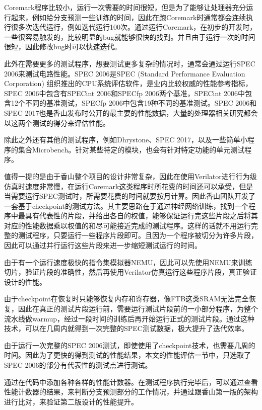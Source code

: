 Coremark程序比较小，运行一次需要的时间很短，但是为了能够让处理器充分运行起来，例如给分支预测一些训练的时间，因此在跑Coremark时通常都会连续执行很多次迭代运行，例如迭代运行100次。通过运行Coremark，在初步的开发时，一些很容易触发的，比较明显的bug就能够很快的找到。并且由于运行一次的时间很短，因此修改bug时可以快速迭代。

此外在需要更多的测试程序，想要测试更多复杂的情况时，通常会通过运行SPEC 2006\cite{spec-2006}来测试电路性能。SPEC 2006是SPEC (Standard Performance Evaluation Corporation) 组织推出的CPU系统评估软件，是业内比较权威的性能参考指标，SPEC 2006中包含有SPECint 2006和SPECfp 2006两个基准，SPECint 2006中包含12个不同的基准测试，SPECfp 2006中包含19种不同的基准测试。SPEC 2006和SPEC 2017也是香山发布时公开的最主要的性能数据，大量的处理器相关研究都会以这两个测试的得分来评估性能。

除此之外还有其他的测试程序，例如Dhrystone\cite{dhrystone}、SPEC 2017，以及一些简单小程序的集合Microbench。针对某些特定的模块，也会有针对特定功能的单元测试程序。


值得一提的是由于香山整个项目的设计非常复杂，因此在使用Verilator进行行为级仿真时速度非常慢，在运行Coremark这类程序时所花费的时间还可以承受，但是当需要运行SPEC测试时，所需要花费的时间就要按月计算。因此香山团队开发了一套基于checkpoint的测试方法。其主要思路在于通过神经网络训练，找到一个程序中最具有代表性的片段，并给出各自的权值，能够保证运行完这些片段之后将其对应的性能数据乘以权值的和尽可能接近完成的测试程序。这样的话就不用运行完整的测试程序，只要运行一些程序片段即可。且因为一个程序被切分为许多片段，因此可以通过并行运行这些片段来进一步缩短测试运行的时间。

由于有一个运行速度极快的指令集模拟器NEMU，因此可以先使用NEMU来训练切片，验证片段的准确性，然后再使用Verilator仿真运行这些程序片段，真正验证设计的性能。

由于checkpoint在恢复时只能够恢复内存和寄存器，像FTB这类SRAM无法完全恢复，因此在真正的测试片段运行前，需要运行测试片段前的一小部分程序，为整个流水线做warmup，经过一段时间的训练后再开始运行正式的测试片段。通过这种技术，可以在几周内就得到一次完整的SPEC测试数据，极大提升了迭代效率。

由于运行一次完整的SPEC 2006测试，即使使用了checkpoint技术，也需要几周的时间。因此为了更快的得到测试的性能结果，本文的性能评估一节中，只选取了SPEC 2006的部分有代表性的测试点进行测试。

通过在代码中添加各种各样的性能计数器。在测试程序执行完毕后，可以通过查看性能计数器的结果，来判断分支预测部分的工作情况，并通过跟香山第一版的架构进行比对，来验证第二版设计的性能提升。

